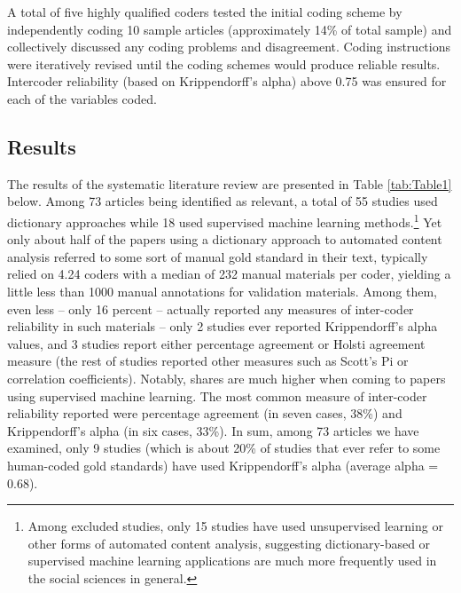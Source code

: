 \documentclass[man, floatsintext, 12pt, a4paper, noextraspace]{apa6}
\begin{document}
    A total of five highly qualified coders tested the initial coding scheme by independently coding 10 sample articles (approximately 14\% of total sample) and collectively discussed any coding problems and disagreement. Coding instructions were iteratively revised until the coding schemes would produce reliable results. Intercoder reliability (based on Krippendorff’s alpha) above 0.75 was ensured for each of the variables coded.   
    
\subsection{Results}

    The results of the systematic literature review are presented in Table \ref{tab:Table1} below. Among 73 articles being identified as relevant, a total of 55 studies used dictionary approaches while 18 used supervised machine learning methods.\footnote{ Among excluded studies, only 15 studies have used unsupervised learning or other forms of automated content analysis, suggesting dictionary-based or supervised machine learning applications are much more frequently used in the social sciences in general.\label{fn:Study1}} Yet only about half of the papers using a dictionary approach to automated content analysis referred to some sort of manual gold standard in their text, typically relied on 4.24 coders with a median of 232 manual materials per coder, yielding a little less than 1000 manual annotations for validation materials. Among them, even less – only 16 percent – actually reported any measures of inter-coder reliability in such materials -- only 2 studies ever reported Krippendorff’s alpha values, and 3 studies report either percentage agreement or Holsti agreement measure (the rest of studies reported other measures such as Scott's Pi or correlation coefficients). Notably, shares are much higher when coming to papers using supervised machine learning. The most common measure of inter-coder reliability reported were percentage agreement (in seven cases, 38\%) and Krippendorff’s alpha (in six cases, 33\%). In sum, among 73 articles we have examined, only 9 studies (which is about 20\% of studies that ever refer to some human-coded gold standards) have used Krippendorff’s alpha (average alpha = 0.68). 
    
\end{document}
